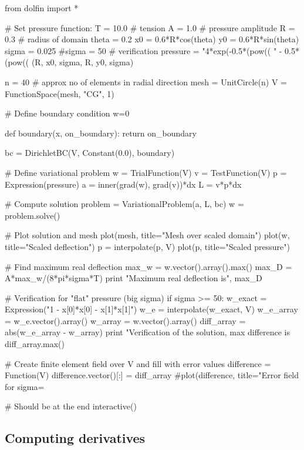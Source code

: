 \begin{python}
from dolfin import *

# Set pressure function:
T = 10.0  # tension
A = 1.0   # pressure amplitude
R = 0.3   # radius of domain
theta = 0.2
x0 = 0.6*R*cos(theta)
y0 = 0.6*R*sin(theta)
sigma = 0.025
#sigma = 50  # verification
pressure = "4*exp(-0.5*(pow((%
           "     - 0.5*(pow((%
           (R, x0, sigma, R, y0, sigma)

n = 40   # approx no of elements in radial direction
mesh = UnitCircle(n)
V = FunctionSpace(mesh, "CG", 1)

# Define boundary condition w=0

def boundary(x, on_boundary):
    return on_boundary

bc = DirichletBC(V, Constant(0.0), boundary)

# Define variational problem
w = TrialFunction(V)
v = TestFunction(V)
p = Expression(pressure)
a = inner(grad(w), grad(v))*dx
L = v*p*dx

# Compute solution
problem = VariationalProblem(a, L, bc)
w = problem.solve()

# Plot solution and mesh
plot(mesh, title="Mesh over scaled domain")
plot(w, title="Scaled deflection")
p = interpolate(p, V)
plot(p, title="Scaled pressure")

# Find maximum real deflection
max_w = w.vector().array().max()
max_D = A*max_w/(8*pi*sigma*T)
print "Maximum real deflection is", max_D

# Verification for "flat" pressure (big sigma)
if sigma >= 50:
    w_exact = Expression("1 - x[0]*x[0] - x[1]*x[1]")
    w_e = interpolate(w_exact, V)
    w_e_array = w_e.vector().array()
    w_array = w.vector().array()
    diff_array = abs(w_e_array - w_array)
    print "Verification of the solution, max difference is %
          diff_array.max()

    # Create finite element field over V and fill with error values
    difference = Function(V)
    difference.vector()[:] = diff_array
    #plot(difference, title="Error field for sigma=%

# Should be at the end
interactive()
\end{python}

\subsection{Computing derivatives}
\label{langtangen:poisson:gradu}


